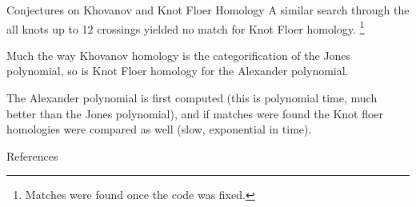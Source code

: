 \documentclass{beamer}
\begin{document}
    \begin{frame}{Conjectures on Khovanov and Knot Floer Homology}
        A similar search through the all knots up to 12 crossings yielded no
        match for Knot Floer homology.%
        \footnote{\textbf{\color{red}{Correction:}} Matches were found once the
                  code was fixed.}
        \par\hfill\par
        Much the way Khovanov homology is the categorification of the Jones
        polynomial, so is Knot Floer homology for the Alexander polynomial.
        \par\hfill\par
        The Alexander polynomial is first computed (this is polynomial time,
        much better than the Jones polynomial), and if matches were found the
        Knot floer homologies were compared as well (slow, exponential in time).
    \end{frame}
    \begin{frame}{References}
        
        
    \end{frame}
\end{document}

